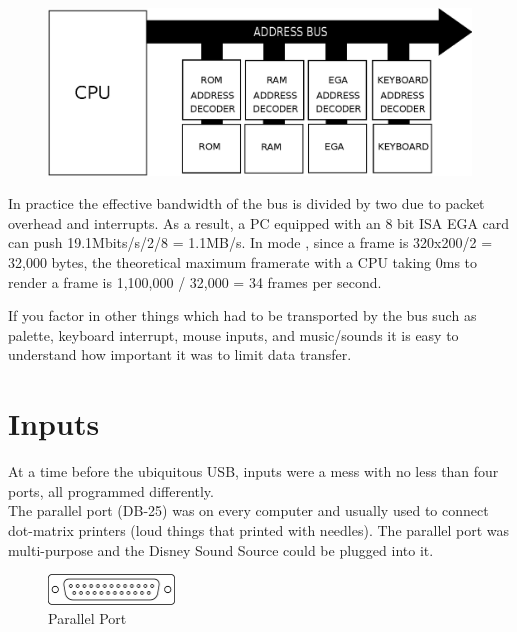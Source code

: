 \documentclass[book.tex]{subfiles}
\begin{document}
\par
 \begin{figure}[H]
\centering
\includegraphics[width=\textwidth]{imgs/drawings/isa.eps}
\end{figure}

\par
 In practice the effective bandwidth of the bus is divided by two due to packet overhead and interrupts. As a result, a PC equipped with an 8 bit ISA EGA card can push 19.1Mbits/s/2/8 = 1.1MB/s. In mode , since a frame is 320x200/2 = 32,000 bytes, the theoretical maximum framerate with a CPU taking 0ms to render a frame is 1,100,000 / 32,000 = 34 frames per second.\\
 \par

 If you factor in other things which had to be transported by the bus such as palette, keyboard interrupt, mouse inputs, and music/sounds it is easy to understand how important it was to limit data transfer.














\section{Inputs}
At a time before the ubiquitous USB, inputs were a mess with no less than four ports, all programmed differently.\\

The parallel port (DB-25) was on every computer and usually used to connect dot-matrix printers (loud things that printed with needles). The parallel port was multi-purpose and the Disney Sound Source could be plugged into it.\\
\par
 \begin{figure}[H]
\centering
\includegraphics[width=0.3\textwidth]{imgs/drawings/ports/DB-25_parallel_port.eps}
\caption{Parallel Port}
\label{fig:parallelPort}
\end{figure}
\end{document}

